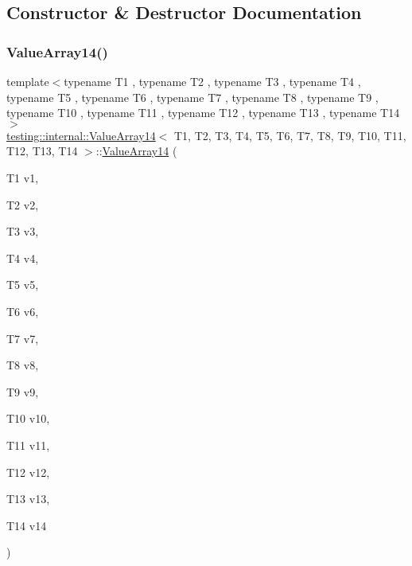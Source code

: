 \subsection{Constructor \& Destructor Documentation}
\mbox{\label{classtesting_1_1internal_1_1_value_array14_a07a09d64aba1260d403adc661546ce48}} 
\subsubsection{\texorpdfstring{ValueArray14()}{ValueArray14()}\hspace{0.1cm}{\footnotesize\ttfamily [1/2]}}
{\footnotesize\ttfamily template$<$typename T1 , typename T2 , typename T3 , typename T4 , typename T5 , typename T6 , typename T7 , typename T8 , typename T9 , typename T10 , typename T11 , typename T12 , typename T13 , typename T14 $>$ \\
\mbox{\hyperlink{classtesting_1_1internal_1_1_value_array14}{testing\+::internal\+::\+Value\+Array14}}$<$ T1, T2, T3, T4, T5, T6, T7, T8, T9, T10, T11, T12, T13, T14 $>$\+::\mbox{\hyperlink{classtesting_1_1internal_1_1_value_array14}{Value\+Array14}} (\begin{DoxyParamCaption}\item[{T1}]{v1,  }\item[{T2}]{v2,  }\item[{T3}]{v3,  }\item[{T4}]{v4,  }\item[{T5}]{v5,  }\item[{T6}]{v6,  }\item[{T7}]{v7,  }\item[{T8}]{v8,  }\item[{T9}]{v9,  }\item[{T10}]{v10,  }\item[{T11}]{v11,  }\item[{T12}]{v12,  }\item[{T13}]{v13,  }\item[{T14}]{v14 }\end{DoxyParamCaption})\hspace{0.3cm}{\ttfamily [inline]}}

